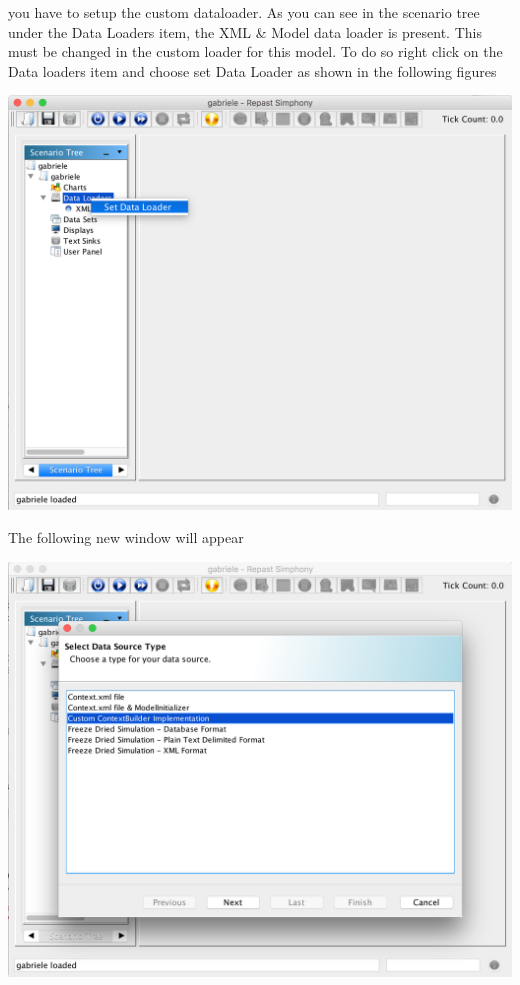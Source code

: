 \documentclass{book}
\begin{document}

you have to setup the custom dataloader. As you can see in the scenario tree under the Data Loaders item, the XML \& Model data loader is present. This must be changed in the custom loader for this model. To do so right click on the Data loaders item and choose set Data Loader as shown in the following figures


\noindent
\includegraphics[scale=0.35]{fig_gabriele_rs_gui2}

The following new window will appear

\noindent
\includegraphics[scale=0.35]{fig_gabriele_rs_gui3}
\end{document}
